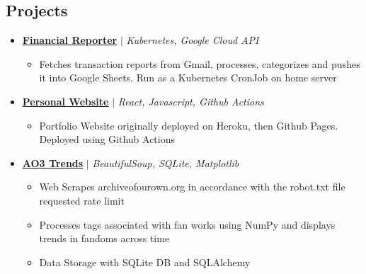 \documentclass[letterpaper,11pt]{article}
\newcommand{\resumeItem}[1]{
  \item\small{
    {#1 \vspace{-2pt}}
  }
}
\newcommand{\resumeProjectHeading}[3]{
    \item \small{\href{#3}{\uline{#1}} $|$ \textit{#2}\vspace{-5pt}}
}
\newcommand{\resumeSubHeadingListStart}{\begin{itemize}[leftmargin=0.15in, label={}]}
\newcommand{\resumeSubHeadingListEnd}{\end{itemize}}
\newcommand{\resumeItemListStart}{\begin{itemize}}
\newcommand{\resumeItemListEnd}{\end{itemize}\vspace{-5pt}}
\begin{document}
\begin{multicols*}{2}
  \section{Projects}
  \resumeSubHeadingListStart
    \resumeProjectHeading
      {\textbf{Financial Reporter}}{Kubernetes, Google Cloud API} {https://github.com/cjschen/google-projects/}
      \resumeItemListStart
        \resumeItem{Fetches transaction reports from Gmail, processes, categorizes and pushes it into Google Sheets. Run as a Kubernetes CronJob on home server}
      \resumeItemListEnd
    \resumeProjectHeading
      {\textbf{Personal Website}}{React, Javascript, Github Actions}  {https://github.com/cjschen/homepage}
      \resumeItemListStart
        \resumeItem{Portfolio Website originally deployed on Heroku, then Github Pages. Deployed using Github Actions}
      \resumeItemListEnd
    \resumeProjectHeading
      {\textbf{AO3 Trends}}{BeautifulSoup, SQLite, Matplotlib}  {https://github.com/cjschen/ao3-stats}
      \resumeItemListStart
        \resumeItem{Web Scrapes archiveofourown.org in accordance with the robot.txt file requested rate limit}
        \resumeItem{Processes tags associated with fan works using NumPy and displays trends in fandoms across time}
        \resumeItem{Data Storage with SQLite DB and SQLAlchemy}
      \resumeItemListEnd
    \resumeSubHeadingListEnd
    \end{multicols*}
\end{document}
